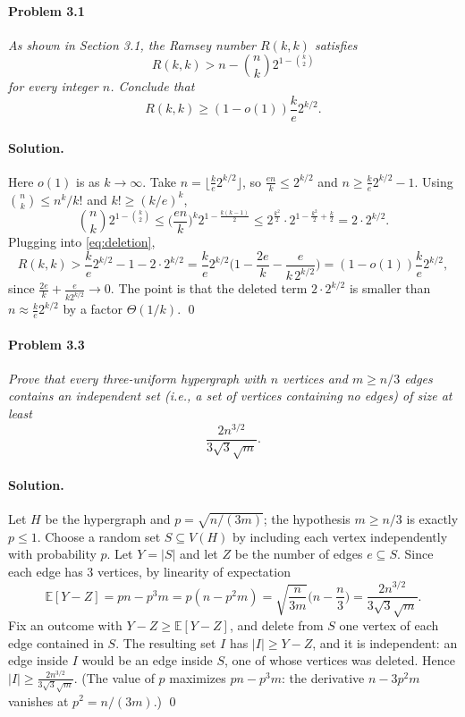 \documentclass[a4paper,12pt]{article}
\newcommand{\card}[1]{\left| #1 \right|}
\newcommand{\mb}[1]{\mathbb{#1}}
\theoremstyle{definition}
\theoremstyle{plain}
\begin{document}
\paragraph{Problem 3.1} \emph{As shown in Section 3.1, the Ramsey number $R(k,k)$ satisfies
\[
	R(k,k) > n - \binom nk 2^{1 - \binom k2}
\]
for every integer $n$. Conclude that
\[
	R(k,k) \ge (1 - o(1)) \frac ke 2^{k/2} .
\]}

\paragraph{Solution.} Here $o(1)$ is as $k \to \infty$. Take $n = \lfloor \frac ke 2^{k/2} \rfloor$, so $\frac{en}{k} \le 2^{k/2}$ and $n \ge \frac ke 2^{k/2} - 1$. Using $\binom nk \le n^k/k!$ and $k! \ge (k/e)^k$,
\[
	\binom nk 2^{1 - \binom k2} \le \Big( \frac{en}{k} \Big)^k 2^{1 - \frac{k(k-1)}{2}} \le 2^{\frac{k^2}{2}} \cdot 2^{1 - \frac{k^2}{2} + \frac k2} = 2 \cdot 2^{k/2} .
\]
Plugging into \eqref{eq:deletion},
\[
	R(k,k) > \frac ke 2^{k/2} - 1 - 2 \cdot 2^{k/2} = \frac ke 2^{k/2} \Big( 1 - \frac{2e}{k} - \frac{e}{k \, 2^{k/2}} \Big) = (1 - o(1)) \frac ke 2^{k/2},
\]
since $\frac{2e}{k} + \frac{e}{k 2^{k/2}} \to 0$. The point is that the deleted term $2 \cdot 2^{k/2}$ is smaller than $n \approx \frac ke 2^{k/2}$ by a factor $\Theta(1/k)$. \qed

\paragraph{Problem 3.3} \emph{Prove that every three-uniform hypergraph with $n$ vertices and $m \ge n/3$ edges contains an independent set (i.e., a set of vertices containing no edges) of size at least
\[
	\frac{2 n^{3/2}}{3 \sqrt 3 \sqrt m} .
\]}

\paragraph{Solution.} Let $H$ be the hypergraph and $p = \sqrt{n / (3m)}$; the hypothesis $m \ge n/3$ is exactly $p \le 1$. Choose a random set $S \subseteq V(H)$ by including each vertex independently with probability $p$. Let $Y = \card S$ and let $Z$ be the number of edges $e \subseteq S$. Since each edge has $3$ vertices, by linearity of expectation
\[
	\mb E[Y - Z] = pn - p^3 m = p (n - p^2 m) = \sqrt{\frac{n}{3m}} \Big( n - \frac n3 \Big) = \frac{2 n^{3/2}}{3\sqrt 3 \sqrt m} .
\]
Fix an outcome with $Y - Z \ge \mb E[Y - Z]$, and delete from $S$ one vertex of each edge contained in $S$. The resulting set $I$ has $\card I \ge Y - Z$, and it is independent: an edge inside $I$ would be an edge inside $S$, one of whose vertices was deleted. Hence $\card I \ge \frac{2 n^{3/2}}{3\sqrt 3 \sqrt m}$. (The value of $p$ maximizes $pn - p^3 m$: the derivative $n - 3p^2 m$ vanishes at $p^2 = n/(3m)$.) \qed
\end{document}

